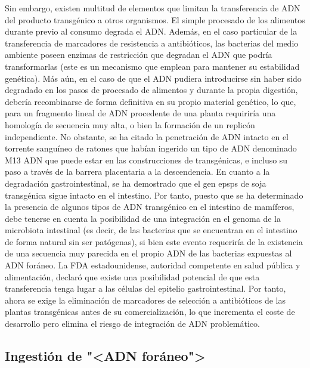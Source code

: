 \documentclass[11pt,a4paper]{article}
\begin{document}
Sin embargo, existen multitud de elementos que limitan la transferencia de ADN del producto transgénico a otros organismos. El simple procesado de los alimentos durante previo al consumo degrada el ADN.
Además, en el caso particular de la transferencia de marcadores de resistencia a antibióticos, las bacterias del medio ambiente poseen enzimas de restricción que degradan el ADN que podría transformarlas (este es un mecanismo que emplean para mantener su estabilidad genética).
Más aún, en el caso de que el ADN pudiera introducirse sin haber sido degradado en los pasos de procesado de alimentos y durante la propia digestión, debería recombinarse de forma definitiva en su propio material genético, lo que, para un fragmento lineal de ADN procedente de una planta requiriría una homología de secuencia muy alta, o bien la formación de un replicón independiente.
No obstante, se ha citado la penetración de ADN intacto en el torrente sanguíneo de ratones que habían ingerido un tipo de ADN denominado M13 ADN que puede estar en las construcciones de transgénicas, e incluso su paso a través de la barrera placentaria a la descendencia.
En cuanto a la degradación gastrointestinal, se ha demostrado que el gen epsps de soja transgénica sigue intacto en el intestino.
Por tanto, puesto que se ha determinado la presencia de algunos tipos de ADN transgénico en el intestino de mamíferos, debe tenerse en cuenta la posibilidad de una integración en el genoma de la microbiota intestinal (es decir, de las bacterias que se encuentran en el intestino de forma natural sin ser patógenas), si bien este evento requeriría de la existencia de una secuencia muy parecida en el propio ADN de las bacterias expuestas al ADN foráneo.
La FDA estadounidense, autoridad competente en salud pública y alimentación, declaró que existe una posibilidad potencial de que esta transferencia tenga lugar a las células del epitelio gastrointestinal. Por tanto, ahora se exige la eliminación de marcadores de selección a antibióticos de las plantas transgénicas antes de su comercialización, lo que incrementa el coste de desarrollo pero elimina el riesgo de integración de ADN problemático.




\subsection{Ingestión de "<ADN foráneo">}
\end{document}
